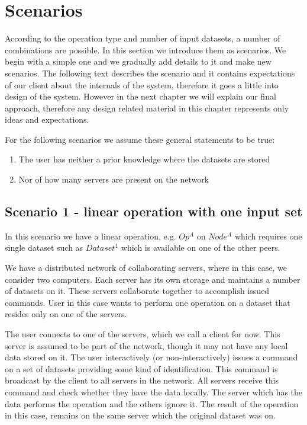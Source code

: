 \section{Scenarios}
According to the operation type and number of input datasets, a number of combinations are possible.
In this section we introduce them as scenarios. We begin with a simple one and we gradually add details 
to it and make new scenarios. The following text describes the scenario and it contains expectations of 
our client about the internals of the system, therefore it goes a little into design of the system. 
However in the next chapter we will explain our final approach, therefore any design related material in
this chapter represents only ideas and expectations.%

For the following scenarios we assume these general statements to be true:
\begin{enumerate}
\item The user has neither a prior knowledge where the datasets are stored
\item Nor of how many servers are present on the network
\end{enumerate}

\subsection{Scenario 1 - linear operation with one input set}
\label{sc:sc1}
In this scenario we have a linear operation, e.g. \(Op^A\) on \(Node^A\) which
requires one single dataset such as \( Dataset^1 \) which is available on one of the other peers.

We have a distributed network of collaborating servers, where in this case, we consider two computers. 
Each server has its own storage and maintains a number of datasets on it. These servers collaborate 
together to accomplish issued commands. 
User in this case wants to perform one operation on a dataset that resides only on one of the servers. 

The user connects to one of the servers, which we call a client for now. 
This server is assumed to be part of the network, though it may not have any local data stored on it.
The user interactively (or non-interactively) issues a command on a set of datasets providing some kind of identification.
This command is broadcast by the client to all servers in the network.
All servers receive this command and check whether they have the data locally. 
The server which has the data performs the operation and the others ignore it.
The result of the operation in this case, remains on the same server which the original dataset was on. 

